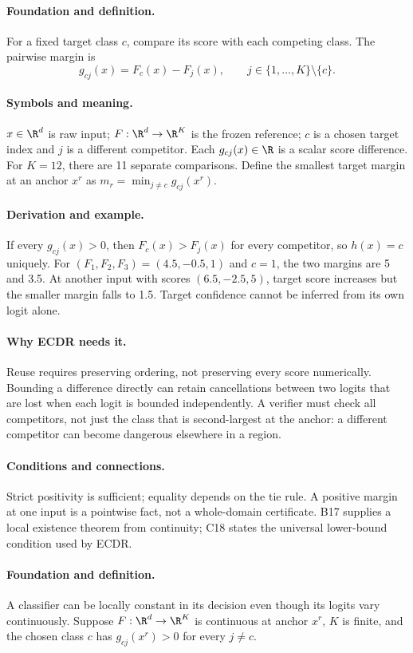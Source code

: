 \paragraph{Foundation and definition.}
For a fixed target class $c$, compare its score with each competing class.
The pairwise margin is
\[
 g_{cj}(x)=F_c(x)-F_j(x),\qquad j\in\{1,\ldots,K\}\setminus\{c\}.
\]
\paragraph{Symbols and meaning.}
$x\in\R^d$ is raw input; $F:\R^d\to\R^K$ is the frozen reference;
$c$ is a chosen target index and $j$ is a different competitor. Each
$g_{cj}(x)\in\R$ is a scalar score difference. For $K=12$, there are
11 separate comparisons. Define the smallest target margin at an anchor
$x^r$ as $m_r=\min_{j\ne c}g_{cj}(x^r)$.
\paragraph{Derivation and example.}
If every $g_{cj}(x)>0$, then $F_c(x)>F_j(x)$ for every competitor, so
$h(x)=c$ uniquely. For $(F_1,F_2,F_3)=(4.5,-0.5,1)$ and $c=1$,
the two margins are 5 and 3.5. At another input with scores
$(6.5,-2.5,5)$, target score increases but the smaller margin falls to
1.5. Target confidence cannot be inferred from its own logit alone.
\paragraph{Why ECDR needs it.}
Reuse requires preserving ordering, not preserving every score numerically.
Bounding a difference directly can retain cancellations between two logits
that are lost when each logit is bounded independently. A verifier must
check all competitors, not just the class that is second-largest at the
anchor: a different competitor can become dangerous elsewhere in a region.
\paragraph{Conditions and connections.}
Strict positivity is sufficient; equality depends on the tie rule.
A positive margin at one input is a pointwise fact, not a whole-domain
certificate. B17 supplies a local existence theorem from continuity;
C18 states the universal lower-bound condition used by ECDR.

\paragraph{Foundation and definition.}
A classifier can be locally constant in its decision even though its
logits vary continuously. Suppose $F:\R^d\to\R^K$ is continuous at
anchor $x^r$, $K$ is finite, and the chosen class $c$ has
$g_{cj}(x^r)>0$ for every $j\ne c$.
